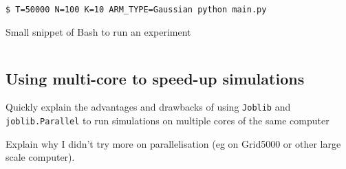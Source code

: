 \begin{listing}[h!]
    \begin{verbatim}
$ T=50000 N=100 K=10 ARM_TYPE=Gaussian python main.py
    \end{verbatim}
    \caption{Small snippet of Bash to run an experiment}
    \label{lst:3:howToRunExperiment2}
\end{listing}

\begin{small}
    \inputminted[linenos=true,numbersep=5pt,frame=lines,framesep=2mm]{python3}{2-Chapters/3-Chapter/src/example_of_configuration_singleplayer.py}
\end{small}


\subsection{Using multi-core to speed-up simulations}


Quickly explain the advantages and drawbacks of using \texttt{Joblib} and \texttt{joblib.Parallel} to run simulations on multiple cores of the same computer

Explain why I didn't try more on parallelisation (eg on Grid5000 or other large scale computer).
